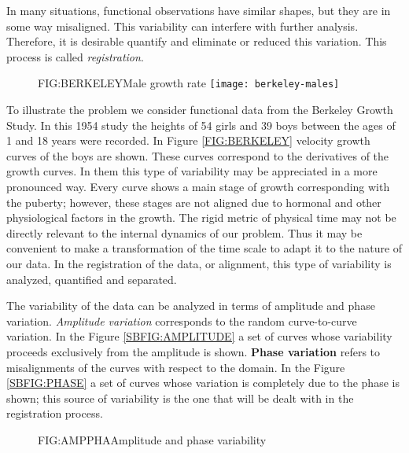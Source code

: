 In many situations, functional observations have
similar shapes, but they are in some way misaligned. This variability can
interfere with further analysis. Therefore, it is desirable quantify and
eliminate or reduced this variation. This process is called \textit{registration}.


\begin{figure}[Male growth rate]{FIG:BERKELEY}{Male growth rate}
	\texttt{[image: berkeley-males]}
\end{figure}

To illustrate the problem we consider functional data from the Berkeley Growth
Study\cite{berkeley}. In this 1954 study the heights of 54
girls and 39 boys between the ages of 1 and 18 years were recorded. In Figure
\ref{FIG:BERKELEY} velocity growth curves of the boys are shown.
These curves correspond to the derivatives of the growth curves. In them this
type of variability may be appreciated in a more pronounced way.
Every curve shows a main stage of growth corresponding with the puberty;
however, these stages are not aligned due to hormonal and other
physiological factors in the growth. The rigid metric of physical time may not
be directly relevant to the internal dynamics of our problem. Thus it may be
convenient to make a transformation of the time scale to adapt it to the nature
of our data. In the registration of the data, or alignment, this type of
variability is analyzed, quantified and separated.


The variability of the data can be analyzed in terms of amplitude and
phase variation. \textit{Amplitude variation} corresponds to the
random curve-to-curve variation.
In the Figure \ref{SBFIG:AMPLITUDE} a
set of curves whose variability proceeds exclusively from the amplitude is shown.
\textbf{Phase variation} refers to
misalignments of the curves with respect to the
domain. In the Figure
\ref{SBFIG:PHASE} a set of curves whose variation is completely due
to the phase is shown; this source of variability is the one that will be dealt with in
the registration process.

\begin{figure}[Amplitude and phase variability]{FIG:AMPPHA}{Amplitude and phase variability}
   \quad
\end{figure}
